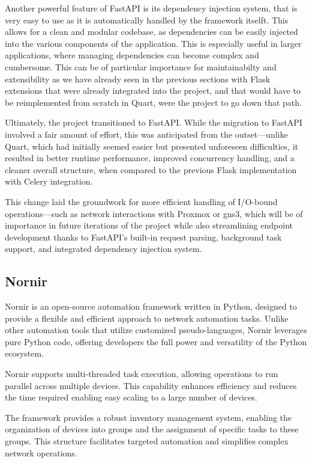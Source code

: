 Another powerful feature of FastAPI is its dependency injection system, that is very easy to use as it is automatically
handled by the framework itselft. This allows for a clean and modular codebase, as dependencies can be easily injected into
the various components of the application. This is especially useful in larger applications, where managing dependencies
can become complex and cumbersome.
This can be of particular importance for maintainabilty and extensibility as we have already seen in the previous sections 
with Flask extensions that were already integrated into the project, and that would have to be reimplemented from scratch 
in Quart, were the project to go down that path. 

Ultimately, the project transitioned to FastAPI. While the migration to FastAPI involved a fair amount of effort, this 
was anticipated from the outset—unlike Quart, which had initially seemed easier but presented unforeseen difficulties, 
it resulted in better runtime performance, improved concurrency handling, and a cleaner overall structure, when compared 
to the previous Flask implementation with Celery integration.

This change laid the groundwork for more efficient handling of I/O-bound operations—such as network interactions with 
Proxmox or \ac{gns3}, which will be of importance in future iterations of the project while also streamlining endpoint 
development thanks to FastAPI's built-in request parsing, background task support, and integrated dependency injection system.

\subsection{Nornir}
Nornir is an open-source automation framework written in Python, designed to provide a flexible and efficient 
approach to network automation tasks\cite{nornir2025}. Unlike other automation tools that utilize customized 
pseudo-languages, Nornir leverages pure Python code, offering developers the full power and versatility of the Python 
ecosystem.

Nornir supports multi-threaded task execution, allowing operations to run parallel across multiple devices.
This capability enhances efficiency and reduces the time required enabling easy scaling to a large number of devices.

The framework provides a robust inventory management system, enabling the organization of devices into groups and the 
assignment of specific tasks to these groups. This structure facilitates targeted automation and simplifies complex 
network operations.


